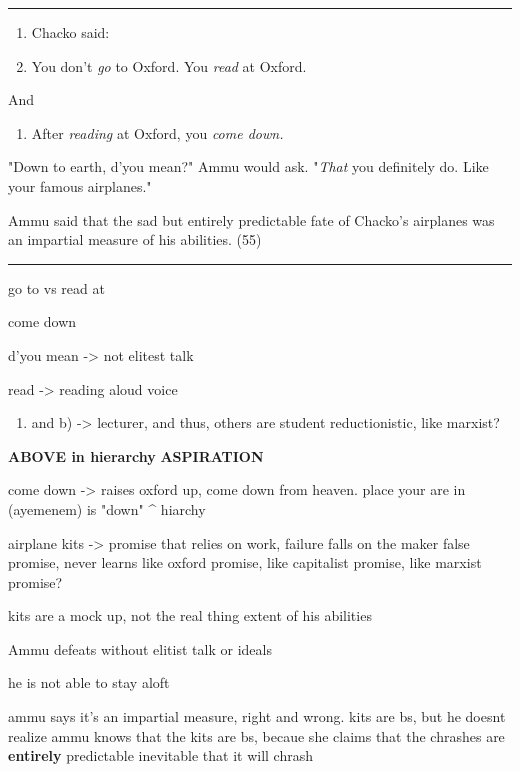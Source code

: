 \documentclass[letterpaper]{article}
\begin{document}
\begin{verbatim}
\end{verbatim}

\noindent\rule{\textwidth}{0.5pt}

\begin{enumerate}
\item Chacko said:

\item You don't \emph{go} to Oxford. You \emph{read} at Oxford.
\end{enumerate}

And

\begin{enumerate}
\item After \emph{reading} at Oxford, you \emph{come down.}
\end{enumerate}

"Down to earth, d'you mean?" Ammu would ask. "\emph{That} you definitely do.
Like your famous airplanes."

Ammu said that the sad but entirely predictable fate of Chacko's
airplanes was an impartial measure of his abilities. (55)

\noindent\rule{\textwidth}{0.5pt}

go to vs read at

come down

d'you mean -> not elitest talk

read -> reading aloud voice

\begin{enumerate}
\item and b) -> lecturer, and thus, others are student reductionistic, like
marxist?
\end{enumerate}

\textbf{ABOVE in hierarchy} \textbf{ASPIRATION}

come down -> raises oxford up, come down from heaven. place your are in
(ayemenem) is "down" \^{} hiarchy

airplane kits -> promise that relies on work, failure falls on the maker
false promise, never learns like oxford promise, like capitalist
promise, like marxist promise?

kits are a mock up, not the real thing extent of his abilities

Ammu defeats without elitist talk or ideals

he is not able to stay aloft

ammu says it's an impartial measure, right and wrong. kits are bs, but
he doesnt realize ammu knows that the kits are bs, becaue she claims
that the chrashes are \textbf{entirely} predictable inevitable that it will
chrash
\end{document}
